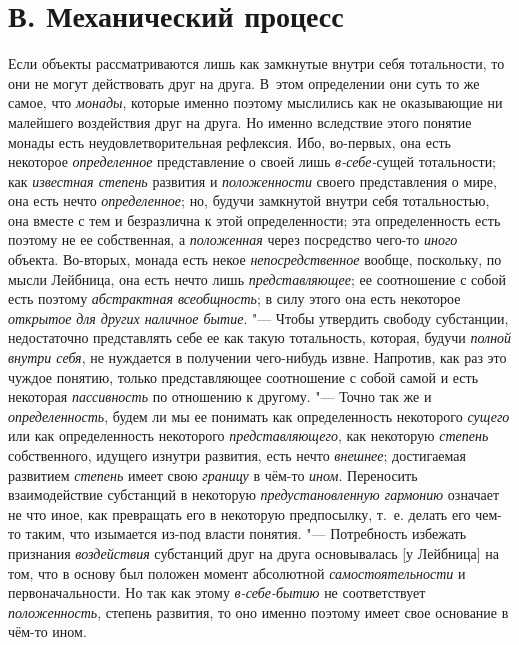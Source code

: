 \section[В. Механический процесс]{В. Механический процесс}
Если объекты рассматриваются лишь как замкнутые внутри себя
тотальности, то они не могут действовать друг на друга. В~этом определении
они суть то же самое, что {\em монады},
которые именно поэтому мыслились как не оказывающие ни
малейшего воздействия друг на друга. Но именно вследствие этого понятие
монады есть неудовлетворительная рефлексия. Ибо, во-первых, она есть
некоторое {\em определенное} представление о своей лишь {\em в-себе-}сущей
тотальности; как {\em известная степень} развития и {\em положенности} своего
представления о мире, она есть нечто {\em определенное}; но,
будучи замкнутой внутри себя тотальностью, она вместе с тем и безразлична к
этой определенности; эта определенность есть поэтому не ее собственная, а
{\em положенная} через посредство чего-то {\em иного}
объекта. Во-вторых, монада есть некое {\em непосредственное}
вообще, поскольку, по мысли Лейбница, она есть нечто лишь
{\em представляющее}; ее соотношение с собой есть поэтому
{\em абстрактная всеобщность}; в силу этого она есть некоторое
{\em открытое} {\em для других наличное бытие}. "---
Чтобы утвердить свободу субстанции, недостаточно представлять
себе ее как такую тотальность, которая, будучи {\em полной внутри себя},
не нуждается в получении чего-нибудь извне. Напротив, как раз
это чуждое понятию, только представляющее соотношение с собой самой и есть
некоторая {\em пассивность} по отношению к другому. "--- Точно так же и
{\em определенность}, будем ли мы ее понимать как определенность некоторого
{\em сущего} или как определенность некоторого {\em представляющего},
как некоторую {\em степень} собственного, идущего изнутри развития, есть нечто
{\em внешнее}; достигаемая развитием {\em степень} имеет свою
{\em границу} в чём-то {\em ином}. Переносить
взаимодействие субстанций в некоторую
{\em предустановленную гармонию}
означает не что иное, как превращать его в некоторую
предпосылку, т.~е. делать его чем-то таким, что изымается из-под власти
понятия. "--- Потребность избежать признания {\em воздействия}
субстанций друг на друга основывалась [у Лейбница] на том,
что в основу был положен момент абсолютной
{\em самостоятельности} и первоначальности. Но так как этому
{\em в-себе-бытию} не соответствует {\em положенность},
степень развития, то оно именно поэтому имеет свое основание в чём-то ином.

